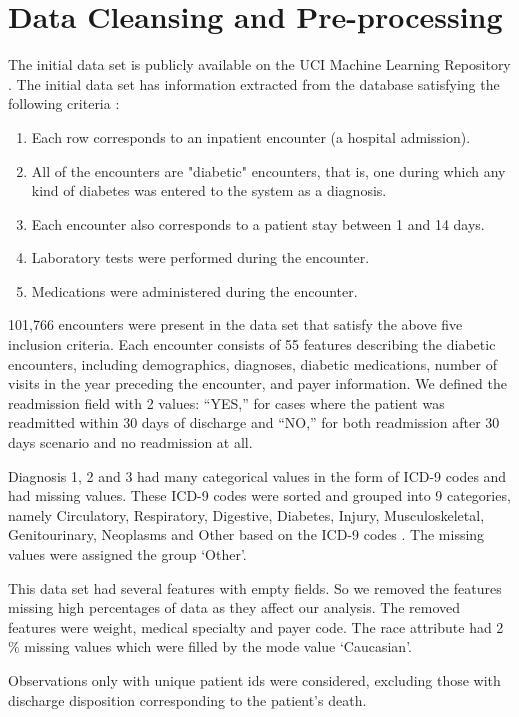 \documentclass[9pt,twocolumn,twoside]{../../styles/osajnl}
\begin{document}
\section{Data Cleansing and Pre-processing}
The initial data set is publicly available on the UCI Machine Learning Repository \cite{www-dataset}.
The initial data set has information extracted from the database satisfying the following criteria \cite{article-hindawi}:
\begin{enumerate}
    \item Each row corresponds to an inpatient encounter (a hospital admission).
    \item All of the encounters are "diabetic" encounters, that is, one during which any kind of diabetes was entered to the system as a diagnosis.
    \item Each encounter also corresponds to a patient stay between 1 and 14 days.
    \item Laboratory tests were performed during the encounter.
    \item Medications were administered during the encounter.
\end{enumerate}

101,766 encounters were present in  the data set that satisfy the above five inclusion criteria. Each encounter consists of 55 features describing the diabetic encounters, including demographics, diagnoses, diabetic medications, number of visits in the year preceding the encounter, and payer information. We defined the readmission  field with 2 values: “YES,” for cases where the patient was readmitted within 30 days of discharge and “NO,” for both readmission after 30 days scenario and no readmission at all.

Diagnosis 1, 2 and 3 had many categorical values in the form of ICD-9 codes and had missing values. These ICD-9 codes were sorted and grouped into 9 categories, namely Circulatory, Respiratory, Digestive, Diabetes, Injury, Musculoskeletal, Genitourinary, Neoplasms and Other based on the ICD-9 codes \cite{article-hindawi}. The missing values were assigned the group ‘Other’.

This data set had several  features with empty fields. So we removed the features missing high percentages of data as they affect our analysis. The removed  features were weight, medical specialty and payer code. The race attribute had 2$\%$ missing values which were filled by the mode value ‘Caucasian’.

Observations only with unique patient ids were considered, excluding those with discharge disposition corresponding to the patient’s death.
\end{document}
